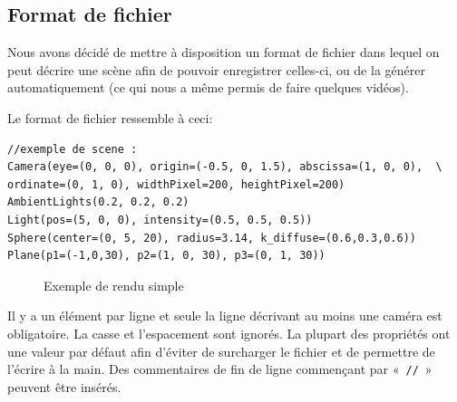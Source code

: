 \documentclass[a4paper]{article}
\begin{document}
  \subsection{Format de fichier}
    Nous avons décidé de mettre à disposition un format de fichier dans lequel
    on peut décrire une scène afin de pouvoir enregistrer celles-ci, ou de la
    générer automatiquement (ce qui nous a même permis de faire quelques
    vidéos).

    Le format de fichier ressemble à ceci:
    \begin{lstlisting}[caption=Exemple de fichier associé à la figure
    \ref{fig:rendusimple}]
//exemple de scene :
Camera(eye=(0, 0, 0), origin=(-0.5, 0, 1.5), abscissa=(1, 0, 0),  \
ordinate=(0, 1, 0), widthPixel=200, heightPixel=200)
AmbientLights(0.2, 0.2, 0.2)
Light(pos=(5, 0, 0), intensity=(0.5, 0.5, 0.5))
Sphere(center=(0, 5, 20), radius=3.14, k_diffuse=(0.6,0.3,0.6))
Plane(p1=(-1,0,30), p2=(1, 0, 30), p3=(0, 1, 30))
    \end{lstlisting}

    \begin{figure}[h]
      \caption{Exemple de rendu simple\label{fig:rendusimple}}
    \end{figure}

    Il y a un élément par ligne et seule la ligne décrivant au moins une caméra
    est obligatoire. La casse et l'espacement sont ignorés. La plupart des
    propriétés ont une valeur par défaut afin d'éviter de surcharger le
    fichier et de permettre de l'écrire à la main. Des commentaires de fin de
    ligne commençant par «~\verb+//+~» peuvent être insérés.
\end{document}
